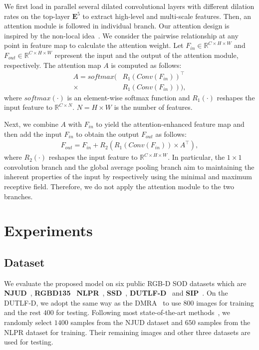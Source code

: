 \documentclass[runningheads]{llncs}
\begin{document}
We first load in parallel several dilated convolutional layers with different dilation rates on the top-layer $\mathbf{E}^5$ to extract high-level and multi-scale features. 
Then, an attention module is followed in individual branch. Our attention design is inspired by the non-local idea~\cite{Nonlocal}. We consider the pairwise relationship at any point in feature map to calculate the attention weight. Let $F_{in}  \in \mathbb{R}^{C \times H \times W}$ and $F_{out}  \in \mathbb{R}^{C \times H \times W}$ represent the input and the output of the attention module, respectively.  The attention map $A$ is computed as follows:
\begin{equation}\label{equ:5}
\begin{split}
A  = softmax(& R_1(Conv(F_{in}))^\top \\
  \times & R_1(Conv(F_{in}))), 
\end{split} 
\end{equation}
where $softmax(\cdot)$ is an element-wise softmax function and $R_1(\cdot)$ reshapes the input feature to $\mathbb{R}^{C \times N}$. $N = {H \times W}$ is the number of features.  

Next, we combine $A$  with  $F_{in}$ to yield the attention-enhanced feature map and then add the input $F_{in}$ to obtain the output $F_{out}$ as follows: 
\begin{equation}\label{equ:6}
\begin{split}
F_{out} = F_{in}+R_2(R_1(Conv(F_{in})) \times A^\top),
\end{split} 
\end{equation}
where $R_2(\cdot)$ reshapes the input feature to $\mathbb{R}^{C \times H \times W}$.  
In particular, the $1 \times 1$ convolution branch and the global average pooling branch aim to maintaining the inherent properties of the input by respectively using the minimal and maximum receptive field. Therefore, we do not apply the attention module to the two branches.

\section{Experiments}
\subsection{Dataset}
 We evaluate the proposed model on six public RGB-D SOD datasets which are \textbf{NJUD}~\cite{NJU2000}, \textbf{RGBD135}~\cite{RGBD135} \textbf{NLPR}~\cite{early_fusion_1}, \textbf{SSD}~\cite{SSD}, \textbf{DUTLF-D}~\cite{DMRA} and \textbf{SIP}~\cite{SIP}.
On the DUTLF-D, we adopt the same way as the DMRA~\cite{DMRA} to use $800$ images for training and the rest $400$ for testing. Following most state-of-the-art methods~\cite{PCA,MMCI,CTMF,CPFP}, we randomly select $1400$ samples from the NJUD dataset and $650$ samples from the NLPR dataset for training. Their remaining images and other three datasets are used for testing. 
\end{document}
